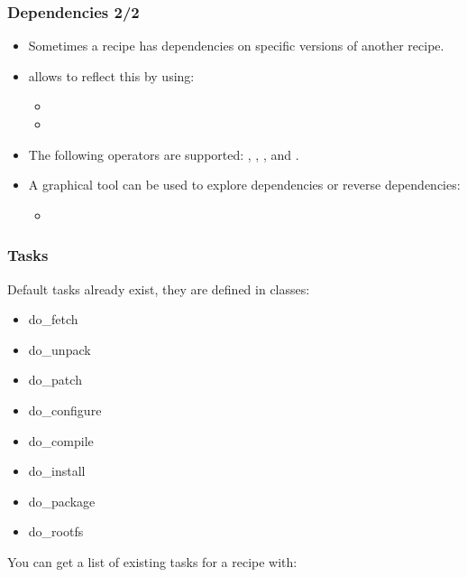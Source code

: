 \begin{frame}
  \frametitle{Dependencies 2/2}
  \begin{itemize}
    \item Sometimes a recipe has dependencies on specific versions
      of another recipe.
    \item {} allows to reflect this by using:
    \begin{itemize}
      \item {}
      \item {}
    \end{itemize}
    \item The following operators are supported: \code{=}, \code{>},
      \code{<}, \code{>=} and \code{<=}.
    \item A graphical tool can be used to explore dependencies or
      reverse dependencies:
    \begin{itemize}
      \item {}
    \end{itemize}
  \end{itemize}
\end{frame}

\begin{frame}[fragile]
  \frametitle{Tasks}
  Default tasks already exist, they are defined in classes:
  \begin{itemize}
    \item do\_fetch
    \item do\_unpack
    \item do\_patch
    \item do\_configure
    \item do\_compile
    \item do\_install
    \item do\_package
    \item do\_rootfs
  \end{itemize}
  You can get a list of existing tasks for a recipe with:
\end{frame}

